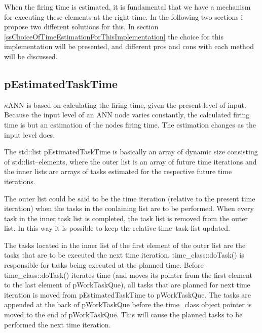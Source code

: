 

	When the firing time is estimated, it is fundamental that we have a mechanism for executing these elements at the right time. 
	In the following two sections i propose two different solutions for this. 
	In section \ref{ssChoiceOfTimeEstimationForThisImplementation} the choice for this implementation will be presented, and different pros and cons with each method will be discussed.



	
	\subsection{pEstimatedTaskTime}
	$\kappa$ANN is based on calculating the firing time, given the present level of input. 
	Because the input level of an ANN node varies constantly, the calculated firing time is but an estimation of the nodes firing time. 
	The estimation changes as the input level does.
	
	The std::list pEstimatedTaskTime is basically an array of dynamic size consisting of std::list--elements,
	where the outer list is an array of future time iterations and the inner lists are arrays of tasks estimated for the respective future time iterations.

	The outer list could be said to be the time iteration (relative to the present time iteration) when the tasks in the conlaining list are to be performed. 
	When every task in the inner task list is completed, %
		the task list is removed from the outer list. 
	In this way it is possible to keep the relative time--task list updated.

	The tasks located in the inner list of the first element of the outer list are the tasks that are to be executed the next time iteration.
	time\_class::doTask() is responsible for tasks being executed at the planned time. 
	Before time\_class::doTask() iterates time (and moves its pointer from the first element to the last element of pWorkTaskQue), all tasks that are planned for next time iteration is moved from pEstimatedTaskTime to pWorkTaskQue.
	The tasks are appended at the back of pWorkTaskQue before the time\_class object pointer is moved to the end of pWorkTaskQue. 
	This will cause the planned tasks to be performed the next time iteration.

